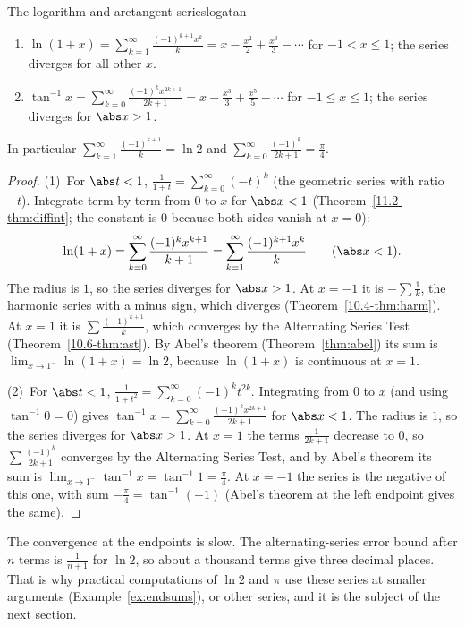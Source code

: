 \documentclass[11pt]{article}
\begin{document}
\begin{thm}{The logarithm and arctangent series}{logatan}
\begin{enumerate}
  \item $\displaystyle\ln(1+x)=\sum_{k=1}^\infty\frac{(-1)^{k+1}x^k}k=x-\frac{x^2}2+\frac{x^3}3-\cdots$ for $-1<x\le1$; the series diverges for all other $x$.
  \item $\displaystyle\tan^{-1}x=\sum_{k=0}^\infty\frac{(-1)^kx^{2k+1}}{2k+1}=x-\frac{x^3}3+\frac{x^5}5-\cdots$ for $-1\le x\le1$; the series diverges for $\abs x>1$.
\end{enumerate}
In particular $\displaystyle\sum_{k=1}^\infty\frac{(-1)^{k+1}}k=\ln2$ and $\displaystyle\sum_{k=0}^\infty\frac{(-1)^k}{2k+1}=\frac\pi4$.
\end{thm}
\begin{proof}
(1)~For $\abs t<1$, $\frac1{1+t}=\sum_{k=0}^\infty(-t)^k$ (the geometric series with ratio $-t$). Integrate term by term from $0$ to $x$ for $\abs x<1$ (Theorem~\ref{11.2-thm:diffint}; the constant is $0$ because both sides vanish at $x=0$):
\[
\ln(1+x)=\sum_{k=0}^\infty\frac{(-1)^kx^{k+1}}{k+1}=\sum_{k=1}^\infty\frac{(-1)^{k+1}x^k}k\qquad(\abs x<1).
\]
The radius is $1$, so the series diverges for $\abs x>1$. At $x=-1$ it is $-\sum\frac1k$, the harmonic series with a minus sign, which diverges (Theorem~\ref{10.4-thm:harm}). At $x=1$ it is $\sum\frac{(-1)^{k+1}}k$, which converges by the Alternating Series Test (Theorem~\ref{10.6-thm:ast}). By Abel's theorem (Theorem~\ref{thm:abel}) its sum is $\lim_{x\to1^-}\ln(1+x)=\ln2$, because $\ln(1+x)$ is continuous at $x=1$.

(2)~For $\abs t<1$, $\frac1{1+t^2}=\sum_{k=0}^\infty(-1)^kt^{2k}$. Integrating from $0$ to $x$ (and using $\tan^{-1}0=0$) gives $\tan^{-1}x=\sum_{k=0}^\infty\frac{(-1)^kx^{2k+1}}{2k+1}$ for $\abs x<1$. The radius is $1$, so the series diverges for $\abs x>1$. At $x=1$ the terms $\frac1{2k+1}$ decrease to $0$, so $\sum\frac{(-1)^k}{2k+1}$ converges by the Alternating Series Test, and by Abel's theorem its sum is $\lim_{x\to1^-}\tan^{-1}x=\tan^{-1}1=\frac\pi4$. At $x=-1$ the series is the negative of this one, with sum $-\frac\pi4=\tan^{-1}(-1)$ (Abel's theorem at the left endpoint gives the same).
\end{proof}

The convergence at the endpoints is slow. The alternating-series error bound after $n$ terms is $\frac1{n+1}$ for $\ln2$, so about a thousand terms give three decimal places. That is why practical computations of $\ln2$ and $\pi$ use these series at smaller arguments (Example~\ref{ex:endsums}), or other series, and it is the subject of the next section.
\end{document}
